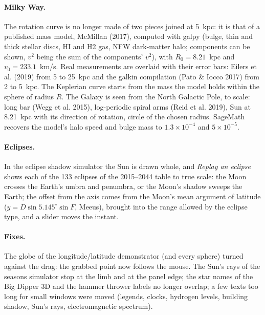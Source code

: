 \paragraph{Milky Way.} The rotation curve is no longer made of two pieces joined at 5~kpc: it is that of a published
mass model, McMillan (2017), computed with galpy (bulge, thin and thick stellar discs, HI and H2 gas, NFW dark-matter
halo; components can be shown, $v^2$ being the sum of the components' $v^2$), with $R_0 = 8.21$~kpc and
$v_0 = 233.1$~km/s. Real measurements are overlaid with their error bars: Eilers et al. (2019) from 5 to 25~kpc and
the galkin compilation (Pato \& Iocco 2017) from 2 to 5~kpc. The Keplerian curve starts from the mass the model holds
within the sphere of radius $R$. The Galaxy is seen from the North Galactic Pole, to scale: long bar (Wegg et al.
2015), log-periodic spiral arms (Reid et al. 2019), Sun at 8.21~kpc with its direction of rotation, circle of the
chosen radius. SageMath recovers the model's halo speed and bulge mass to $1.3\times10^{-4}$ and $5\times10^{-5}$.

\paragraph{Eclipses.} In the eclipse shadow simulator the Sun is drawn whole, and \emph{Replay an eclipse} shows each
of the 133 eclipses of the 2015–2044 table to true scale: the Moon crosses the Earth's umbra and penumbra, or the
Moon's shadow sweeps the Earth; the offset from the axis comes from the Moon's mean argument of latitude
($y = D \sin 5.145^\circ \sin F$, Meeus), brought into the range allowed by the eclipse type, and a slider moves the
instant.

\paragraph{Fixes.} The globe of the longitude/latitude demonstrator (and every sphere) turned against the drag: the
grabbed point now follows the mouse. The Sun's rays of the seasons simulator stop at the limb and at the panel edge;
the star names of the Big Dipper 3D and the hammer thrower labels no longer overlap; a few texts too long for small
windows were moved (legends, clocks, hydrogen levels, building shadow, Sun's rays, electromagnetic spectrum).


